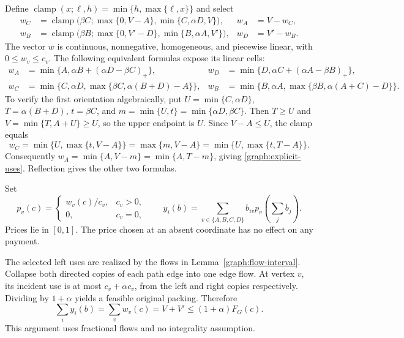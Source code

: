 Define $\operatorname{clamp}(x;\ell,h)=\min\{h,\max\{\ell,x\}\}$ and
select
\begin{align}
 w_C&=\operatorname{clamp}\bigl(\beta C;
             \max\{0,V-A\},\min\{C,\alpha D,V\}\bigr),
 &w_A&=V-w_C,\label{graph:selector}\\
 w_B&=\operatorname{clamp}\bigl(\beta B;
             \max\{0,V'-D\},\min\{B,\alpha A,V'\}\bigr),
 &w_D&=V'-w_B.\nonumber
\end{align}
The vector $w$ is continuous, nonnegative, homogeneous, and piecewise
linear, with $0\le w_v\le c_v$. The following equivalent formulas expose
its linear cells:
\begin{align}
 w_A&=\min\{A,\alpha B+(\alpha D-\beta C)_+\},
 &w_D&=\min\{D,\alpha C+(\alpha A-\beta B)_+\},\label{graph:explicit-uses}\\
 w_C&=\min\{C,\alpha D,\max\{\beta C,\alpha(B+D)-A\}\},
 &w_B&=\min\{B,\alpha A,\max\{\beta B,\alpha(A+C)-D\}\}.\nonumber
\end{align}
To verify the first orientation algebraically, put
$U=\min\{C,\alpha D\}$, $T=\alpha(B+D)$, $t=\beta C$, and
$m=\min\{U,t\}=\min\{\alpha D,\beta C\}$.
Then $T\ge U$ and $V=\min\{T,A+U\}\ge U$, so the upper endpoint is
$U$. Since $V-A\le U$, the clamp equals
\[
 w_C=\min\{U,\max\{t,V-A\}\}
     =\max\{m,V-A\}
     =\min\{U,\max\{t,T-A\}\}.
\]
Consequently
$w_A=\min\{A,V-m\}=\min\{A,T-m\}$, giving
\eqref{graph:explicit-uses}. Reflection gives the other two formulas.

Set
\begin{equation}\label{graph:prices}
 p_v(c)=\begin{cases}w_v(c)/c_v,&c_v>0,\\0,&c_v=0,\end{cases}
 \qquad y_i(b)=\sum_{v\in\{A,B,C,D\}}b_{iv}p_v\left(\sum_j b_j\right).
\end{equation}
Prices lie in $[0,1]$. The price chosen at an absent coordinate has no
effect on any payment.

The selected left uses are realized by the flows in
Lemma~\ref{graph:flow-interval}. Collapse both directed copies of each
path edge into one edge flow. At vertex $v$, its incident use is at most
$c_v+\alpha c_v$, from the left and right copies respectively. Dividing
by $1+\alpha$ yields a feasible original packing. Therefore
\begin{equation}\label{graph:flow-funding}
 \sum_i y_i(b)=\sum_v w_v(c)=V+V'\le(1+\alpha)F_G(c).
\end{equation}
This argument uses fractional flows and no integrality assumption.

